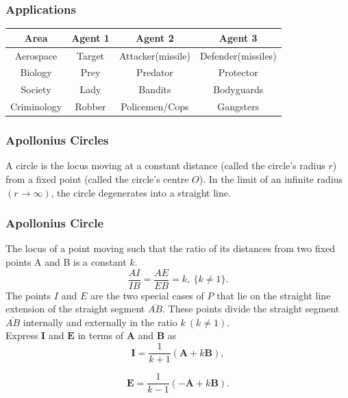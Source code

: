 \documentclass{beamer}
\begin{document}
\begin{frame}
\frametitle{Applications}
\begin{center}
	\begin{tabular}{ |c||c|c|c| } 
		\hline
		Area & Agent 1 & Agent 2 & Agent 3 \\
		\hline
		\hline
		Aerospace & Target & Attacker(missile) & Defender(missiles)\\
		\hline 
		Biology & Prey & Predator & Protector \\
		\hline 
		Society & Lady & Bandits & Bodyguards\\ 
		\hline
		Criminology & Robber & Policemen/Cops & Gangsters \\ 
		\hline
	\end{tabular}
	\label{tableTAD}
\end{center}  
\end{frame}
\begin{frame}
\frametitle{Apollonius Circles}
A circle is the locus moving at a constant distance (called the circle's radius $r$) from a fixed point (called the circle's centre $O$).
In the limit of an infinite radius $(r\longrightarrow\infty)$, the circle degenerates into a straight line.
\end{frame}
\begin{frame}
\frametitle{Apollonius Circle}
 The locus of a point moving such that the ratio of its distances from two fixed points A and B is a constant $k$.
 \begin{equation}
   \boxed{
   \dfrac{AI}{IB}=\dfrac{AE}{EB}=k,\ \{k\neq1\}.}
   \label{eqn:kratio}
    \end{equation} 
   The points $I$ and $E$ are the two special cases of $P$ that lie on the straight line extension of the straight segment $\overline{AB}$. These points divide the straight segment $\overline{AB}$ internally and externally in the ratio $k\ (k\neq1)$.\\
   
    Express $\boldsymbol{I}$ and $\boldsymbol{E}$ in terms of $\boldsymbol{A}$ and $\boldsymbol{B}$ as 
   \begin{equation}
   \boldsymbol{I} = \dfrac{1}{k+1} (\boldsymbol{A}+k\boldsymbol{B}),
   \label{eqn:ipoint}
   \end{equation}
   
   \begin{equation}
   \boldsymbol{E} = \dfrac{1}{k-1} (-\boldsymbol{A}+k\boldsymbol{B}).
   \label{eqn:epoint}
   \end{equation}   
\end{frame}
\end{document}

